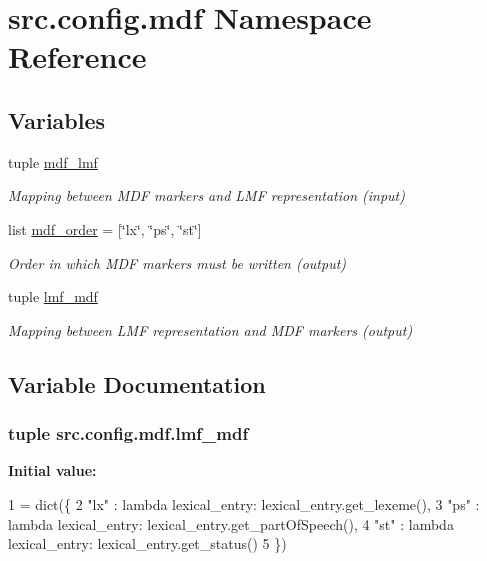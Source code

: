 \hypertarget{namespacesrc_1_1config_1_1mdf}{\section{src.\+config.\+mdf Namespace Reference}
\label{namespacesrc_1_1config_1_1mdf}
}
\subsection*{Variables}
\begin{DoxyCompactItemize}
\item 
tuple \hyperlink{namespacesrc_1_1config_1_1mdf_af881a7b706c096ffc4facc7ffafa7687}{mdf\+\_\+lmf}
\begin{DoxyCompactList}\small\item\em Mapping between M\+D\+F markers and L\+M\+F representation (input) \end{DoxyCompactList}\item 
list \hyperlink{namespacesrc_1_1config_1_1mdf_a0761366bb6d76340e4bea370efce7a7a}{mdf\+\_\+order} = \mbox{[}\char`\"{}lx\char`\"{}, \char`\"{}ps\char`\"{}, \char`\"{}st\char`\"{}\mbox{]}
\begin{DoxyCompactList}\small\item\em Order in which M\+D\+F markers must be written (output) \end{DoxyCompactList}\item 
tuple \hyperlink{namespacesrc_1_1config_1_1mdf_a85342c221b552d567a7af5ca05c83727}{lmf\+\_\+mdf}
\begin{DoxyCompactList}\small\item\em Mapping between L\+M\+F representation and M\+D\+F markers (output) \end{DoxyCompactList}\end{DoxyCompactItemize}


\subsection{Variable Documentation}
\hypertarget{namespacesrc_1_1config_1_1mdf_a85342c221b552d567a7af5ca05c83727}{
\subsubsection[{lmf\+\_\+mdf}]{\setlength{\rightskip}{0pt plus 5cm}tuple src.\+config.\+mdf.\+lmf\+\_\+mdf}}\label{namespacesrc_1_1config_1_1mdf_a85342c221b552d567a7af5ca05c83727}
{\bfseries Initial value\+:}
\begin{DoxyCode}
1 = dict(\{
2     \textcolor{stringliteral}{"lx"} : \textcolor{keyword}{lambda} lexical\_entry: lexical\_entry.get\_lexeme(),
3     \textcolor{stringliteral}{"ps"} : \textcolor{keyword}{lambda} lexical\_entry: lexical\_entry.get\_partOfSpeech(),
4     \textcolor{stringliteral}{"st"} : \textcolor{keyword}{lambda} lexical\_entry: lexical\_entry.get\_status()
5 \})
\end{DoxyCode}



